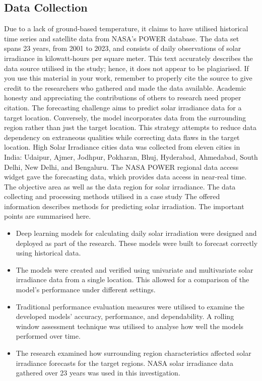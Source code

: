 \documentclass[a4paper,fleqn]{cas-sc}
\begin{document}
\subsection{Data Collection}
Due to a lack of ground-based temperature, it claims to have utilised historical time series and satellite data from NASA's POWER database. The data set spans 23 years, from 2001 to 2023, and consists of daily observations of solar irradiance in kilowatt-hours per square meter. This text accurately describes the data source utilised in the study; hence, it does not appear to be plagiarised. If you use this material in your work, remember to properly cite the source to give credit to the researchers who gathered and made the data available. Academic honesty and appreciating the contributions of others to research need proper citation. The forecasting challenge aims to predict solar irradiance data for a target location. Conversely, the model incorporates data from the surrounding region rather than just the target location. This strategy attempts to reduce data dependency on extraneous qualities while correcting data flaws in the target location.
High Solar Irradiance cities data was collected from eleven cities in India: Udaipur, Ajmer, Jodhpur, Pokharan, Bhuj, Hyderabad, Ahmedabad, South Delhi, New Delhi, and Bengaluru. The NASA POWER regional data access widget gave the forecasting data, which provides data access in near-real time. The objective area as well as the data region for solar irradiance. The data collecting and processing methods utilised in a case study The offered information describes methods for predicting solar irradiation. The important points are summarised here\cite{brahma2020solar}.

\begin{itemize}
\item
Deep learning models for calculating daily solar irradiation were designed and deployed as part of the research. These models were built to forecast correctly using historical data.
\item
The models were created and verified using univariate and multivariate solar irradiance data from a single location. This allowed for a comparison of the model's performance under different settings.

\item
Traditional performance evaluation measures were utilised to examine the developed models' accuracy, performance, and dependability. A rolling window assessment technique was utilised to analyse how well the models performed over time.
\item
The research examined how surrounding region characteristics affected solar irradiance forecasts for the target regions. NASA solar irradiance data gathered over 23 years was used in this investigation.

\end{itemize}
\end{document}
